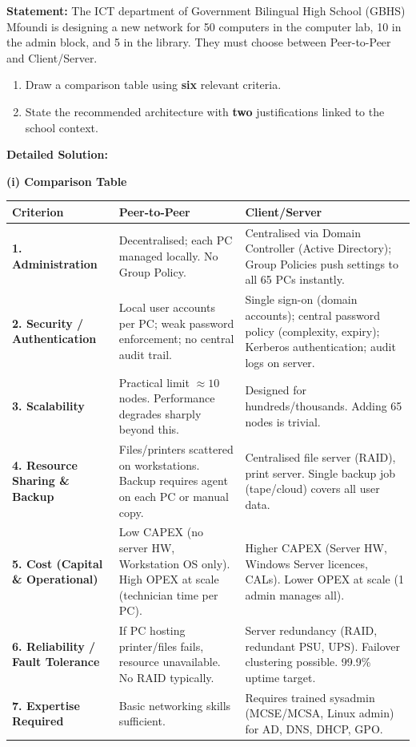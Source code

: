 \documentclass[11pt]{article}
\begin{document}
\begin{exoresolu}
\textbf{Statement:}
The ICT department of Government Bilingual High School (GBHS) Mfoundi is designing a new network for 50 computers in the computer lab, 10 in the admin block, and 5 in the library. They must choose between Peer-to-Peer and Client/Server.
\begin{enumerate}
    \item Draw a comparison table using \textbf{six} relevant criteria.
    \item State the recommended architecture with \textbf{two} justifications linked to the school context.
\end{enumerate}

\tcblower
\textbf{Detailed Solution:}

\noindent\textbf{(i) Comparison Table}

\begin{center}
\begin{tabularx}{\linewidth}{|l|X|X|}
\hline
\rowcolor{popblueL}
\textbf{Criterion} & \textbf{Peer-to-Peer} & \textbf{Client/Server} \\
\hline
\textbf{1. Administration} & Decentralised; each PC managed locally. No Group Policy. & Centralised via Domain Controller (Active Directory); Group Policies push settings to all 65 PCs instantly. \\
\hline
\textbf{2. Security / Authentication} & Local user accounts per PC; weak password enforcement; no central audit trail. & Single sign-on (domain accounts); central password policy (complexity, expiry); Kerberos authentication; audit logs on server. \\
\hline
\textbf{3. Scalability} & Practical limit $\approx 10$ nodes. Performance degrades sharply beyond this. & Designed for hundreds/thousands. Adding 65 nodes is trivial. \\
\hline
\textbf{4. Resource Sharing \& Backup} & Files/printers scattered on workstations. Backup requires agent on each PC or manual copy. & Centralised file server (RAID), print server. Single backup job (tape/cloud) covers all user data. \\
\hline
\textbf{5. Cost (Capital \& Operational)} & Low CAPEX (no server HW, Workstation OS only). High OPEX at scale (technician time per PC). & Higher CAPEX (Server HW, Windows Server licences, CALs). Lower OPEX at scale (1 admin manages all). \\
\hline
\textbf{6. Reliability / Fault Tolerance} & If PC hosting printer/files fails, resource unavailable. No RAID typically. & Server redundancy (RAID, redundant PSU, UPS). Failover clustering possible. 99.9\% uptime target. \\
\hline
\textbf{7. Expertise Required} & Basic networking skills sufficient. & Requires trained sysadmin (MCSE/MCSA, Linux admin) for AD, DNS, DHCP, GPO. \\
\hline
\end{tabularx}
\end{center}


\end{exoresolu}
\end{document}
